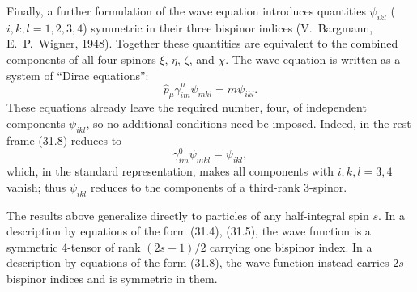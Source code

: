 Finally, a further formulation of the wave equation introduces quantities $\psi_{ikl}$ ($i,k,l=1,2,3,4$) symmetric in their three bispinor indices (V.~Bargmann, E.~P.~Wigner, 1948). Together these quantities are equivalent to the combined components of all four spinors $\xi$, $\eta$, $\zeta$, and $\chi$. The wave equation is written as a system of ``Dirac equations'':
\begin{equation}
\widehat p_\mu\gamma^\mu_{im}\psi_{mkl}=m\psi_{ikl}.
\tag{31.8}
\end{equation}
These equations already leave the required number, four, of independent components $\psi_{ikl}$, so no additional conditions need be imposed. Indeed, in the rest frame (31.8) reduces to
\[
\gamma^0_{im}\psi_{mkl}=\psi_{ikl},
\]
which, in the standard representation, makes all components with $i,k,l=3,4$ vanish; thus $\psi_{ikl}$ reduces to the components of a third-rank 3-spinor.

The results above generalize directly to particles of any half-integral spin $s$. In a description by equations of the form (31.4), (31.5), the wave function is a symmetric 4-tensor of rank $(2s-1)/2$ carrying one bispinor index. In a description by equations of the form (31.8), the wave function instead carries $2s$ bispinor indices and is symmetric in them.
